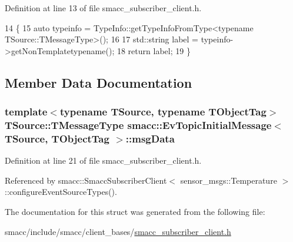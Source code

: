 Definition at line 13 of file smacc\+\_\+subscriber\+\_\+client.\+h.


\begin{DoxyCode}
14   \{
15     \textcolor{keyword}{auto} typeinfo = TypeInfo::getTypeInfoFromType<typename TSource::TMessageType>();
16 
17     std::string label = typeinfo->getNonTemplatetypename();
18     \textcolor{keywordflow}{return} label;
19   \}
\end{DoxyCode}


\subsection{Member Data Documentation}
\subsubsection[{\texorpdfstring{msg\+Data}{msgData}}]{\setlength{\rightskip}{0pt plus 5cm}template$<$typename T\+Source, typename T\+Object\+Tag$>$ T\+Source\+::\+T\+Message\+Type {\bf smacc\+::\+Ev\+Topic\+Initial\+Message}$<$ T\+Source, T\+Object\+Tag $>$\+::msg\+Data}\hypertarget{structsmacc_1_1EvTopicInitialMessage_a12015628fea3b4a0aa07e6a11fcffeda}{}\label{structsmacc_1_1EvTopicInitialMessage_a12015628fea3b4a0aa07e6a11fcffeda}


Definition at line 21 of file smacc\+\_\+subscriber\+\_\+client.\+h.



Referenced by smacc\+::\+Smacc\+Subscriber\+Client$<$ sensor\+\_\+msgs\+::\+Temperature $>$\+::configure\+Event\+Source\+Types().



The documentation for this struct was generated from the following file\+:\begin{DoxyCompactItemize}
\item 
smacc/include/smacc/client\+\_\+bases/\hyperlink{smacc__subscriber__client_8h}{smacc\+\_\+subscriber\+\_\+client.\+h}\end{DoxyCompactItemize}
